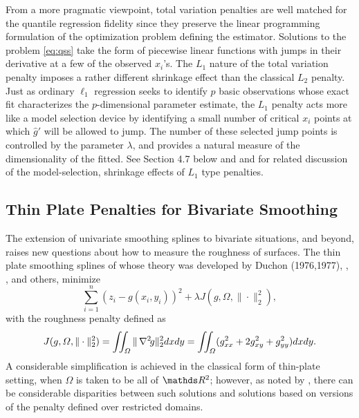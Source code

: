 From a more pragmatic viewpoint, total variation penalties are well matched
for the quantile regression fidelity since they preserve the linear programming
formulation of the optimization problem defining the estimator.  Solutions
to the problem \eqref{eq:qss} take the form of piecewise linear functions with 
jumps in their derivative at a few of the observed $x_i$'s.  
The $L_1$ nature of the total variation
penalty imposes a rather different shrinkage effect than the classical
$L_2$ penalty. Just as ordinary $\ell_1$ regression seeks to identify
$p$ basic observations whose exact fit characterizes the
$p$-dimensional parameter estimate, the $L_1$ penalty acts more like a
model selection device by identifying a small number of critical $x_i$
points at which $\hat g'$ will be allowed to jump. The number of these
selected jump points is controlled by the parameter $\lambda$, and
provides a natural measure of the dimensionality of the fitted.
See Section 4.7 below and  
and  for related discussion of the 
model-selection, shrinkage effects of $L_1$ type penalties.

\subsection{Thin Plate Penalties for Bivariate Smoothing}
The extension of univariate smoothing splines to bivariate situations,
and beyond, raises new questions about how to measure the
roughness of surfaces. The thin plate smoothing splines of 
whose theory was developed by Duchon
(1976,1977),\nocite{Duc76,Duc77} , 
, and others, minimize
\begin{equation}
\sum_{i=1}^n (z_i - g(x_i , y_i ))^2 + \lambda J(g, \varOmega,  \| \cdot  \|_2^2 ),
\label{eq.thinp}
\end{equation}
with the roughness penalty defined as
\begin{equation}
\label{eq.tp}
J(g,\varOmega, \| \cdot  \|_2^2) = 
	\iint_{\varOmega}  \| \,\nabla^2\! g  \|_2^2 dxdy =
	\iint_{\varOmega} ( g_{xx}^2 + 2 g_{xy}^2 + g_{yy}^2 )dxdy.
\end{equation} 
A considerable simplification is achieved in the
classical form of thin-plate setting, when $\varOmega$ is taken to be
all of $\RR^2$; however, as noted by ,
there can be considerable disparities between such solutions and
solutions based on versions of the penalty defined over restricted
domains.  


